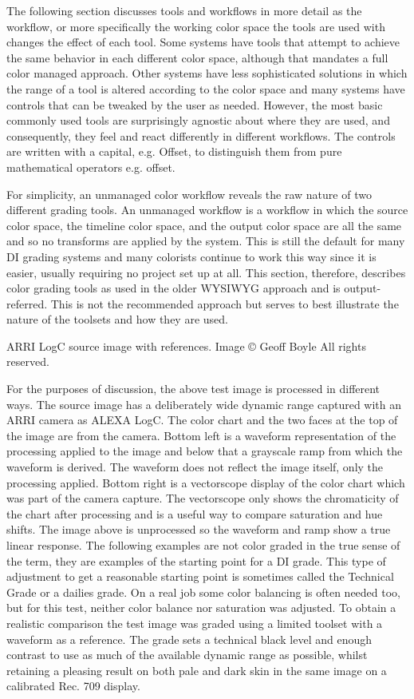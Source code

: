 The following section discusses tools and workflows in more detail as the workflow, or more specifically the working color space the tools are used with changes the effect of each tool. Some systems have tools that attempt to achieve the same behavior in each different color space, although that mandates a full color managed approach. Other systems have less sophisticated solutions in which the range of a tool is altered according to the color space and many systems have controls that can be tweaked by the user as needed. However, the most basic commonly used tools are surprisingly agnostic about where they are used, and consequently, they feel and react differently in different workflows. The controls are written with a capital, e.g. Offset, to distinguish them from pure mathematical operators e.g. offset.

For simplicity, an unmanaged color workflow reveals the raw nature of two different grading tools. An unmanaged workflow is a workflow in which the source color space, the timeline color space, and the output color space are all the same and so no transforms are applied by the system. This is still the default for many DI grading systems and many colorists continue to work this way since it is easier, usually requiring no project set up at all. This section, therefore, describes color grading tools as used in the older WYSIWYG approach and is output-referred. This is not the recommended approach but serves to best illustrate the nature of the toolsets and how they are used.


ARRI LogC source image with references. Image © Geoff Boyle All rights reserved.


For the purposes of discussion, the above test image is processed in different ways. The source image has a deliberately wide dynamic range captured with an ARRI camera as ALEXA LogC. The color chart and the two faces at the top of the image are from the camera. Bottom left is a waveform representation of the processing applied to the image and below that a grayscale ramp from which the waveform is derived. The waveform does not reflect the image itself, only the processing applied. Bottom right is a vectorscope display of the color chart which was part of the camera capture. The vectorscope only shows the chromaticity of the chart after processing and is a useful way to compare saturation and hue shifts. The image above is unprocessed so the waveform and ramp show a true linear response. The following examples are not color graded in the true sense of the term, they are examples of the starting point for a DI grade. This type of adjustment to get a reasonable starting point is sometimes called the Technical Grade or a dailies grade. On a real job some color balancing is often needed too, but for this test, neither color balance nor saturation was adjusted. To obtain a realistic comparison the test image was graded using a limited toolset with a waveform as a reference. The grade sets a technical black level and enough contrast to use as much of the available dynamic range as possible, whilst retaining a pleasing result on both pale and dark skin in the same image on a calibrated Rec. 709 display.

